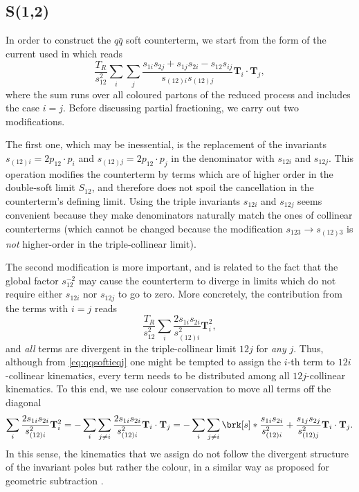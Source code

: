 \documentclass[11pt,a4paper]{article}
\newcommand{\colorT}[1]{\mathbf{T}_{#1}}
\begin{document}
\subsection{S(1,2)}

In order to construct the $q\bar{q}$ soft counterterm,
we start from the form of the current used in \cite{Somogyi:2005xz} which reads
\begin{equation}
	\frac{T_R}{s_{12}^2} \sum_i \sum_j
	\frac{s_{1i}s_{2j} + s_{1j}s_{2i} - s_{12}s_{ij}}{s_{(12)i} s_{(12)j}}
	\colorT{i}\cdot\colorT{j},
\end{equation}
where the sum runs over all coloured partons of the reduced process
and includes the case $i=j$.
Before discussing partial fractioning, we carry out two modifications.

The first one, which may be inessential, is the replacement of
the invariants $s_{(12)i} = 2p_{12}\cdot p_i$ and $s_{(12)j} = 2p_{12}\cdot p_j$
in the denominator with $s_{12i}$ and $s_{12j}$.
This operation modifies the counterterm by terms which are of higher order
in the double-soft limit $S_{12}$, and therefore does not spoil the cancellation
in the counterterm's defining limit.
Using the triple invariants $s_{12i}$ and $s_{12j}$ seems convenient
because they make denominators naturally match the ones of collinear counterterms
(which cannot be changed because the modification $s_{123}\to s_{(12)3}$
is \emph{not} higher-order in the triple-collinear limit).

The second modification is more important, and is related to the fact
that the global factor $s_{12}^{-2}$ may cause the counterterm to diverge
in limits which do not require either $s_{12i}$ nor $s_{12j}$ to go to zero.
More concretely, the contribution from the terms with $i=j$ reads
\begin{equation}
\label{eq:qqsoftieqj}
	\frac{T_R}{s_{12}^2} \sum_{i}
	\frac{2s_{1i}s_{2i}}{s_{(12)i}^2}
	\colorT{i}^2,
\end{equation}
and \emph{all} terms are divergent in the triple-collinear limit $12j$
for \emph{any} $j$.
Thus, although from \cref{eq:qqsoftieqj} one might be tempted
to assign the $i$-th term to $12i$-collinear kinematics,
every term needs to be distributed among all $12j$-collinear kinematics.
To this end, we use colour conservation to move all terms off the diagonal
\begin{equation}
	\sum_{i}
	\frac{2s_{1i}s_{2i}}{s_{(12)i}^2}
	\colorT{i}^2
	= - \sum_i \sum_{j\ne i}
	\frac{2s_{1i}s_{2i}}{s_{(12)i}^2}
	\colorT{i}\cdot\colorT{j}
	= - \sum_i \sum_{j\ne i} \brk[s]*{
	\frac{s_{1i}s_{2i}}{s_{(12)i}^2}
	+ \frac{s_{1j}s_{2j}}{s_{(12)j}^2}
	}
	\colorT{i}\cdot\colorT{j}.
\end{equation}
In this sense, the kinematics that we assign do not follow the divergent structure
of the invariant poles but rather the colour,
in a similar way as proposed for geometric subtraction \cite{Herzog:2018ggi}.
\end{document}
